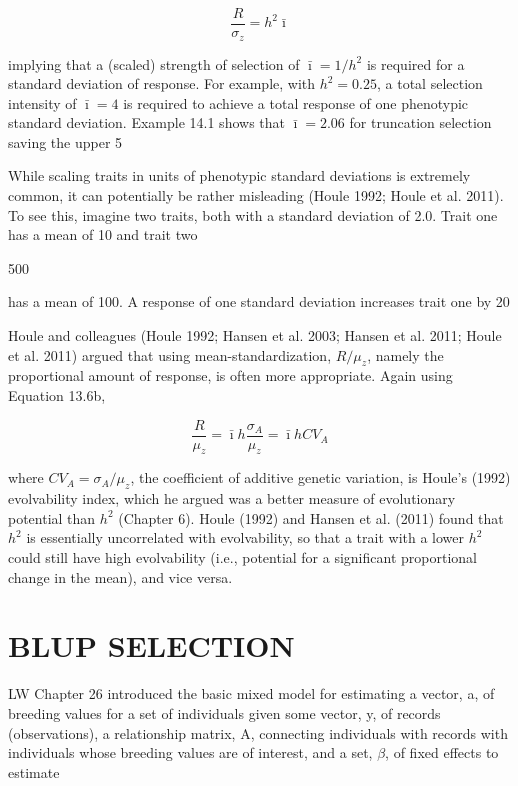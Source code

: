 \documentclass{article}
\begin{document}
\begin{equation}
\frac{R}{\sigma_{z}}=h^{2}\bar{\imath}
\tag{13.22a}
\label{eq:13_22a}
\end{equation}

implying that a (scaled) strength of selection of  $ \bar{\imath} = 1/h^2 $ is required for a standard deviation of response. For example, with  $ h^2 = 0.25 $, a total selection intensity of  $ \bar{\imath} = 4 $ is required to achieve a total response of one phenotypic standard deviation. Example 14.1 shows that  $ \bar{\imath} = 2.06 $ for truncation selection saving the upper 5%

While scaling traits in units of phenotypic standard deviations is extremely common, it can potentially be rather misleading (Houle 1992; Houle et al. 2011). To see this, imagine two traits, both with a standard deviation of 2.0. Trait one has a mean of 10 and trait two

500

has a mean of 100. A response of one standard deviation increases trait one by 20%

Houle and colleagues (Houle 1992; Hansen et al. 2003; Hansen et al. 2011; Houle et al. 2011) argued that using mean-standardization,  $ R/\mu_{z} $, namely the proportional amount of response, is often more appropriate. Again using Equation 13.6b,

\begin{equation}
\frac{R}{\mu_{z}}=\bar{\imath}h\frac{\sigma_{A}}{\mu_{z}}=\bar{\imath}h C V_{A}
\tag{13.22b}
\label{eq:13_22b}
\end{equation}

where  $ CV_A = \sigma_A / \mu_z $, the coefficient of additive genetic variation, is Houle's (1992) evolvability index, which he argued was a better measure of evolutionary potential than  $ h^2 $ (Chapter 6). Houle (1992) and Hansen et al. (2011) found that  $ h^2 $ is essentially uncorrelated with evolvability, so that a trait with a lower  $ h^2 $ could still have high evolvability (i.e., potential for a significant proportional change in the mean), and vice versa.

\section{BLUP SELECTION}
LW Chapter 26 introduced the basic mixed model for estimating a vector, a, of breeding values for a set of individuals given some vector, y, of records (observations), a relationship matrix, A, connecting individuals with records with individuals whose breeding values are of interest, and a set,  $ \beta $, of fixed effects to estimate
\end{document}
